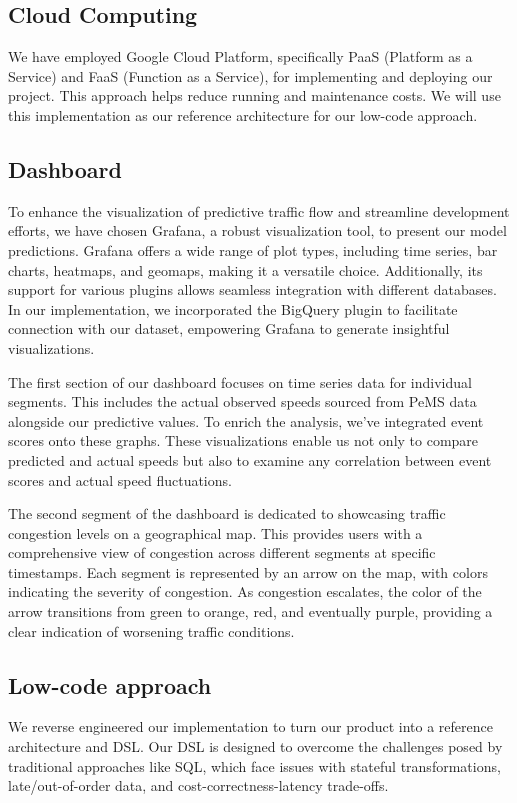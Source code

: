 \documentclass{report}
\begin{document}
\subsection{Cloud Computing}
We have employed Google Cloud Platform, specifically PaaS (Platform as a Service) and FaaS (Function as a Service), for implementing and deploying our project. This approach helps reduce running and maintenance costs. We will use this implementation as our reference architecture for our low-code approach.

\subsection{Dashboard}
 To enhance the visualization of predictive traffic flow and streamline development efforts, we have chosen Grafana, a robust visualization tool, to present our model predictions. Grafana offers a wide range of plot types, including time series, bar charts, heatmaps, and geomaps, making it a versatile choice. Additionally, its support for various plugins allows seamless integration with different databases. In our implementation, we incorporated the BigQuery plugin to facilitate connection with our dataset, empowering Grafana to generate insightful visualizations.

The first section of our dashboard focuses on time series data for individual segments. This includes the actual observed speeds sourced from PeMS data alongside our predictive values. To enrich the analysis, we've integrated event scores onto these graphs. These visualizations enable us not only to compare predicted and actual speeds but also to examine any correlation between event scores and actual speed fluctuations.

The second segment of the dashboard is dedicated to showcasing traffic congestion levels on a geographical map. This provides users with a comprehensive view of congestion across different segments at specific timestamps. Each segment is represented by an arrow on the map, with colors indicating the severity of congestion. As congestion escalates, the color of the arrow transitions from green to orange, red, and eventually purple, providing a clear indication of worsening traffic conditions.
 

\subsection{Low-code approach}
We reverse engineered our implementation to turn our product into a reference architecture and DSL. Our DSL is designed to overcome the challenges posed by traditional approaches like SQL, which face issues with stateful transformations, late/out-of-order data, and cost-correctness-latency trade-offs.
\end{document}
